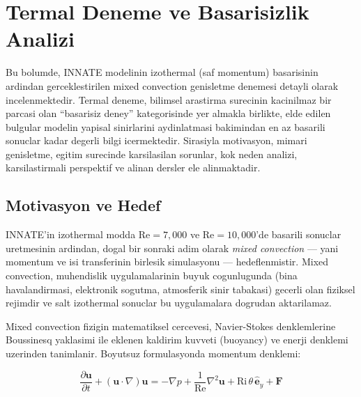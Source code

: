 
\section{Termal Deneme ve Basarisizlik Analizi}
\label{sec:thermal-failure}

Bu bolumde, INNATE modelinin izothermal (saf momentum) basarisinin ardindan
gerceklestirilen mixed convection genisletme denemesi detayli olarak
incelenmektedir. Termal deneme, bilimsel arastirma surecinin kacinilmaz bir
parcasi olan ``basarisiz deney'' kategorisinde yer almakla birlikte, elde
edilen bulgular modelin yapisal sinirlarini aydinlatmasi bakimindan en az
basarili sonuclar kadar degerli bilgi icermektedir. Sirasiyla motivasyon,
mimari genisletme, egitim surecinde karsilasilan sorunlar, kok neden analizi,
karsilastirmali perspektif ve alinan dersler ele alinmaktadir.


\subsection{Motivasyon ve Hedef}
\label{sec:thermal-motivation}

INNATE'in izothermal modda $\text{Re} = 7{,}000$ ve $\text{Re} = 10{,}000$'de
basarili sonuclar uretmesinin ardindan, dogal bir sonraki adim olarak
\emph{mixed convection} --- yani momentum ve isi transferinin birlesik
simulasyonu --- hedeflenmistir. Mixed convection, muhendislik uygulamalarinin
buyuk cogunlugunda (bina havalandirmasi, elektronik sogutma, atmosferik sinir
tabakasi) gecerli olan fiziksel rejimdir ve salt izothermal sonuclar bu
uygulamalara dogrudan aktarilamaz.

Mixed convection fizigin matematiksel cercevesi, Navier-Stokes denklemlerine
Boussinesq yaklasimi ile eklenen kaldirim kuvveti (buoyancy) ve enerji denklemi
uzerinden tanimlanir. Boyutsuz formulasyonda momentum denklemi:

\begin{equation}
  \frac{\partial \mathbf{u}}{\partial t}
  + (\mathbf{u} \cdot \nabla)\mathbf{u}
  = -\nabla p
  + \frac{1}{\text{Re}}\nabla^2 \mathbf{u}
  + \text{Ri}\,\theta\,\hat{\mathbf{e}}_y
  + \mathbf{F}
  \label{eq:momentum-boussinesq}
\end{equation}

